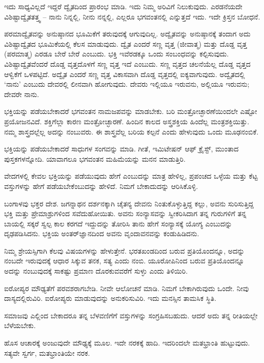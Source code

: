 ಇದು ಸಾಧ್ಯವಿಲ್ಲದೆ ಇದ್ದರೆ ದ್ವೈತದಿಂದ ಪ್ರಾರಂಭ ಮಾಡಿ. ಇದು ನಿಮ್ಮ ಅರಿವಿಗೆ ನಿಲುಕುವುದು. ಎರಡನೆಯದೇ ವಿಶಿಷ್ಟಾದ್ವೈತತತ್ತ್ವ – ನಾನು ನಿನ್ನಲ್ಲಿ, ನೀನು ನನ್ನಲ್ಲಿ, ಎಲ್ಲರೂ ಭಗವಂತನಲ್ಲಿ ಎನ್ನುತ್ತದೆ ಇದು. ಇದೇ ಕ್ರಿಸ್ತನ ಬೋಧನೆ.

ಪರಮಾದ್ವೈತವನ್ನು ಅನುಷ್ಠಾನದ ಭೂಮಿಕೆಗೆ ತರುವುದಕ್ಕೆ ಆಗುವುದಿಲ್ಲ. ಅದ್ವೈತವನ್ನು ಅನುಷ್ಠಾನಕ್ಕೆ ತಂದಾಗ ಅದು ವಿಶಿಷ್ಟಾದ್ವೈತದ ಭೂಮಿಕೆಯಲ್ಲಿ ಕೆಲಸ ಮಾಡುವುದು. ದ್ವೈತ ಎಂದರೆ ಸಣ್ಣ ವೃತ್ತ (ಜೀವಾತ್ಮ) ಮತ್ತು ದೊಡ್ಡ ವೃತ್ತ (ಪರಮಾತ್ಮ) ಎರಡೂ ಬೇರೆ ಬೇರೆ ಎಂಬುದು. ಭಕ್ತಿ ಇವೆರಡಕ್ಕೂ ಒಂದು ಸಂಬಂಧವನ್ನು ಕಲ್ಪಿಸುವುದು. ವಿಶಿಷ್ಟಾದ್ವೈತವೆಂದರೆ ದೊಡ್ಡ ವೃತ್ತದೊಳಗೆ ಸಣ್ಣ ವೃತ್ತ ಇದೆ ಎಂಬುದು. ಸಣ್ಣ ವೃತ್ತದ ಚಲನೆಯೆಲ್ಲ ದೊಡ್ಡ ವೃತ್ತದ ಆಳ್ವಿಕೆಗೆ ಒಳಪಟ್ಟಿದೆ. ಅದ್ವೈತ ಎಂದರೆ ಸಣ್ಣ ವೃತ್ತ ವಿಕಾಸವಾಗಿ ದೊಡ್ಡ ವೃತ್ತದಲ್ಲಿ ಐಕ್ಯವಾಗುವುದು. ಅದ್ವೈತದಲ್ಲಿ ‘ನಾನು’ ಎಂಬುದು ದೇವರಲ್ಲಿ ಲೀನವಾಗಿ ಹೋಗುವುದು. ದೇವರು ಇಲ್ಲಿಯೂ ಇರುವನು, ಅಲ್ಲಿಯೂ ಇರುವನು; ದೇವರೇ ನಾನು.

ಭಕ್ತಿಯನ್ನು ಪಡೆಯಬೇಕಾದರೆ ಭಗವಂತನ ನಾಮಜಪವನ್ನು ಮಾಡಬೇಕು. ಬರಿ ಮಂತ್ರೋಚ್ಛಾರಣೆಯಿಂದಲೇ ಎಷ್ಟೋ ಪ್ರಯೋಜನವಿದೆ. ಶಕ್ತಿಗೆಲ್ಲಾ ಕಾರಣ ಮಂತ್ರೋಚ್ಛಾರಣೆ. ಹಿಂದಿನ ಕಾಲದ ಅಸ್ತ್ರಶಕ್ತಿಯ ಹಿಂದೆಲ್ಲ ಮಂತ್ರಶಕ್ತಿಯಿತ್ತು. ನಮ್ಮ ಶಾಸ್ತ್ರದಲ್ಲೆಲ್ಲ ಅದನ್ನು ನಂಬುವರು. ಈ ಶಾಸ್ತ್ರವೆಲ್ಲ ಬರಿಯ ಕಲ್ಪನೆ ಎಂದು ಹೇಳುವುದು ಒಂದು ಮೂಢನಂಬಿಕೆ.

ಭಕ್ತಿಯನ್ನು ಪಡೆಯಬೇಕಾದರೆ ಸಾಧುಗಳ ಸಂಗವನ್ನು ಮಾಡಿ. ಗೀತೆ, ಇಮಿಟೇಷನ್ ಆಫ್ ಕ್ರೈಸ್ಟ್,  ಮುಂತಾದ ಪುಸ್ತಕಗಳನ್ನೋದಿ. ಯಾವಾಗಲೂ ಭಗವಂತನ ಮಹಿಮೆಯನ್ನು ಮನನ ಮಾಡುತ್ತಿರಿ.

ವೇದಗಳಲ್ಲಿ ಕೇವಲ ಭಕ್ತಿಯನ್ನು ಪಡೆಯುವುದು ಹೇಗೆ ಎಂಬುದನ್ನು ಮಾತ್ರ ಹೇಳಿಲ್ಲ, ಪ್ರಪಂಚದ ಒಳ್ಳೆಯ ಮತ್ತು ಕೆಟ್ಟ ವಸ್ತುಗಳನ್ನು ಹೇಗೆ ಪಡೆಯಬೇಕೆಂಬುದನ್ನು ಹೇಳಿದೆ. ನಿಮಗೆ ಬೇಕಾದುದನ್ನು ಆರಿಸಿಕೊಳ್ಳಿ.

ಬಂಗಾಳವು ಭಕ್ತರ ದೇಶ. ಜಗನ್ನಾಥನ ದರ್ಶನಕ್ಕಾಗಿ ಚೈತನ್ಯ ದೇವನು ನಿಂತುಕೊಳ್ಳುತ್ತಿದ್ದ ಕಲ್ಲು, ಅವನು ಸುರಿಸುತ್ತಿದ್ದ ಭಕ್ತಿ ಮತ್ತು ಪ್ರೇಮಾಶ್ರುಗಳಿಂದ ಸವೆದುಹೋಯಿತು. ಅವನು ಸಂನ್ಯಾಸವನ್ನು ಸ್ವೀಕರಿಸಿದಾಗ ತನ್ನ ಗುರುಗಳಿಗೆ ತನ್ನ ಬಾಯಲ್ಲಿ ಸಕ್ಕರೆ ಸ್ವಲ್ಪ ಕಾಲ ಕರಗದೆ ಇದ್ದುದನ್ನು ತೋರಿಸಿ ತಾನು ಹೇಗೆ ಸಂನ್ಯಾಸಕ್ಕೆ ಯೋಗ್ಯ ಎಂಬುದನ್ನು ದೃಢಪಡಿಸಿದನು. ಭಕ್ತಿಯ ಅಂತರ್‌ಜ್ಞಾನದಿಂದ ಅವನು ವೃಂದಾವನವನ್ನು ಕಂಡುಹಿಡಿದನು.

ನಿಮ್ಮ ಶ್ರೇಯಸ್ಸಿಗಾಗಿ ಕೆಲವು ವಿಷಯಗಳನ್ನು ಹೇಳುತ್ತೇನೆ. ಭರತಖಂಡದಿಂದ ಬರುವ ಪ್ರತಿಯೊಂದನ್ನೂ, ಅದನ್ನು ನಂಬದೇ ಇರುವುದಕ್ಕೆ ಆಧಾರ ಸಿಕ್ಕುವ ತನಕ, ಸತ್ಯ ಎಂದು ನಂಬಿ. ಯೂರೋಪಿನಿಂದ ಬರುವ ಪ್ರತಿಯೊಂದನ್ನೂ ಅದನ್ನು ನಂಬುವುದಕ್ಕೆ ಸಾಕಷ್ಟು ಪ್ರಮಾಣ ದೊರಕುವವರೆಗೆ ಸುಳ್ಳು ಎಂದು ತಿಳಿಯಿರಿ.

ಐರೋಪ್ಯರ ಮೌಢ್ಯತೆಗೆ ಪರವಶರಾಗಬೇಡಿ. ನೀವೇ ಆಲೋಚನೆ ಮಾಡಿ. ನಿಮಗೆ ಬೇಕಾಗಿರುವುದು ಒಂದೇ. ನೀವು ದಾಸ್ಯದಲ್ಲಿರುವಿರಿ. ಐರೋಪ್ಯರು ಮಾಡುವುದನ್ನು ಅನುಕರಿಸುವಿರಿ. ಇದು ಮನಸ್ಸಿನ ತಾಮಸಿಕ ಸ್ಥಿತಿ.

ಸಮಾಜವು ಎಲ್ಲಿಂದ ಬೇಕಾದರೂ ತನ್ನ ಬೆಳವಣಿಗೆಗೆ ವಸ್ತುಗಳನ್ನು ಸಂಗ್ರಹಿಸಬಹುದು. ಆದರೆ ಅದು ತನ್ನ ರೀತಿಯಲ್ಲೇ ಬೆಳೆಯಬೇಕು.

ಹೊಸ ಆಚಾರಕ್ಕೆ ಅಂಜುವುದೇ ಮೌಢ್ಯಕ್ಕೆ ಮೂಲ. ಇದೇ ನರಕಕ್ಕೆ ಹಾದಿ. ಇದರಿಂದಲೇ ಮತಭ್ರಾಂತಿ ಹುಟ್ಟುವುದು. ಸತ್ಯವೇ ಸ್ವರ್ಗ, ಮತಭ್ರಾಂತಿಯೇ ನರಕ.

